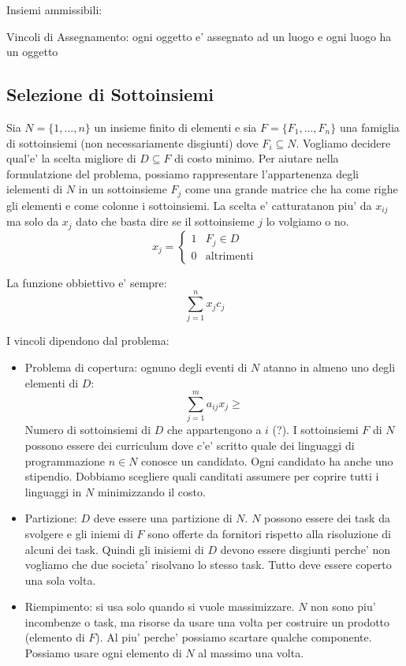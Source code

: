 Insiemi ammissibili:

Vincoli di Assegnamento: ogni oggetto e' assegnato ad un luogo e ogni luogo ha un oggetto

\subsection{Selezione di Sottoinsiemi}

Sia $ N = \{1,...,n\} $ un insieme finito di elementi e sia $ F = \{F_1,...,F_n\} $ una famiglia di sottoinsiemi (non necessariamente disgiunti) dove $ F_i \subseteq N $. Vogliamo decidere qual'e' la scelta migliore di $ D\subseteq F $ di costo minimo. Per aiutare nella formulatzione del problema, possiamo rappresentare l'appartenenza degli ielementi di $ N $ in un sottoinsieme $ F_j $ come una grande matrice che ha come righe gli elementi e come colonne i sottoinsiemi. La scelta e' catturatanon piu' da $ x_{ij} $ ma solo da $ x_j $ dato che basta dire se il sottoinsieme $ j $ lo volgiamo o no. 
\[
x_j = \begin{cases}
1 & F_j \in D\\
0 & \text{altrimenti}
\end{cases}
\]

La funzione obbiettivo e' sempre:
\[
\sum_{j=1}^{n} x_j c_j
\]

I vincoli dipendono dal problema:
\begin{itemize}
\item Problema di copertura: ognuno degli eventi di $ N $ atanno in almeno uno degli elementi di $ D $:
  \[
  \sum_{j=1}^{m} a_{ij}x_j \geq 
  \]
    Numero di sottoinsiemi di $ D $ che appartengono a $ i $ (?). I sottoinsiemi $ F $ di $ N $ possono essere dei curriculum dove c'e' scritto quale dei linguaggi di programmazione $ n \in N $ conosce un candidato. Ogni candidato ha anche uno stipendio. Dobbiamo scegliere quali canditati assumere per coprire tutti i linguaggi in $ N $ minimizzando il costo.  
  \item Partizione: $ D $ deve essere una partizione di $ N $. $ N $ possono essere dei task da svolgere e gli iniemi di $ F $ sono offerte da fornitori rispetto alla risoluzione di alcuni dei task. Quindi gli inisiemi di $ D $ devono essere disgiunti perche' non vogliamo che due societa' risolvano lo stesso task. Tutto deve essere coperto una sola volta.
  \item Riempimento: si usa solo quando si vuole massimizzare. $ N $ non sono piu' incombenze o task, ma risorse da usare una volta per costruire un prodotto (elemento di $ F $). Al piu' perche' possiamo scartare qualche componente. Possiamo usare ogni elemento di $ N $ al massimo una volta. 
\end{itemize}

